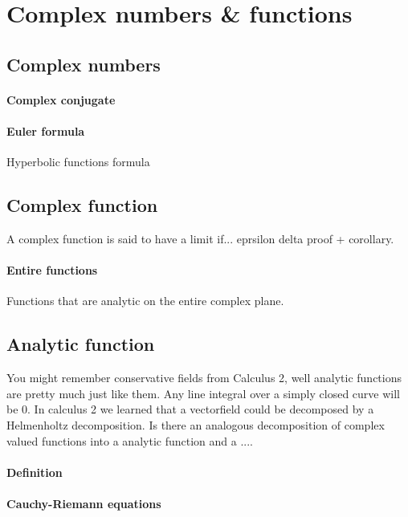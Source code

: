 \section{Complex numbers \& functions}

\subsection{Complex numbers}

\paragraph{Complex conjugate}
\paragraph{Euler formula}

Hyperbolic functions formula

\subsection{Complex function}
A complex function is said to have a limit if... eprsilon delta proof
+ corollary.

\paragraph{Entire functions}
Functions that are analytic on the entire complex plane.


\subsection{Analytic function}
You might remember conservative fields from Calculus 2, well analytic
functions are pretty much just like them. Any line integral over a
simply closed curve will be 0. In calculus 2 we learned that a
vectorfield could be decomposed by a Helmenholtz decomposition. Is
there an analogous decomposition of complex valued functions into a
analytic function and a ....



\paragraph{Definition}

\paragraph{Cauchy-Riemann equations}

